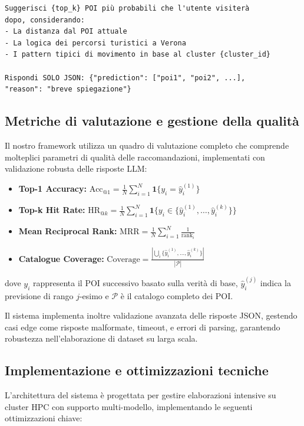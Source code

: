\begin{itemize}
\begin{lstlisting}[language=text, caption=Template di Prompt Comprensivo]
Suggerisci {top_k} POI più probabili che l'utente visiterà 
dopo, considerando:
- La distanza dal POI attuale
- La logica dei percorsi turistici a Verona  
- I pattern tipici di movimento in base al cluster {cluster_id}

Rispondi SOLO JSON: {"prediction": ["poi1", "poi2", ...], 
"reason": "breve spiegazione"}
\end{lstlisting}

\subsection{Metriche di valutazione e gestione della qualità}

Il nostro framework utilizza un quadro di valutazione completo che comprende molteplici parametri di qualità delle raccomandazioni, implementati con validazione robusta delle risposte LLM:

\begin{itemize}
\item \textbf{Top-1 Accuracy:} $\text{Acc}_{@1} = \frac{1}{N}\sum_{i=1}^{N}\mathbf{1}\{y_i = \hat{y}_i^{(1)}\}$
\item \textbf{Top-k Hit Rate:} $\text{HR}_{@k} = \frac{1}{N}\sum_{i=1}^{N}\mathbf{1}\{y_i \in \{\hat{y}_i^{(1)}, \ldots, \hat{y}_i^{(k)}\}\}$
\item \textbf{Mean Reciprocal Rank:} $\text{MRR} = \frac{1}{N}\sum_{i=1}^{N}\frac{1}{\text{rank}_i}$
\item \textbf{Catalogue Coverage:} $\text{Coverage} = \frac{|\bigcup_{i}\{\hat{y}_i^{(1)}, \ldots, \hat{y}_i^{(k)}\}|}{|\mathcal{P}|}$
\end{itemize}

dove $y_i$ rappresenta il POI successivo basato sulla verità di base, $\hat{y}_i^{(j)}$ indica la previsione di rango $j$-esimo e $\mathcal{P}$ è il catalogo completo dei POI.

Il sistema implementa inoltre validazione avanzata delle risposte JSON, gestendo casi edge come risposte malformate, timeout, e errori di parsing, garantendo robustezza nell'elaborazione di dataset su larga scala.

\subsection{Implementazione e ottimizzazioni tecniche}

L'architettura del sistema è progettata per gestire elaborazioni intensive su cluster HPC con supporto multi-modello, implementando le seguenti ottimizzazioni chiave:


\end{itemize}
